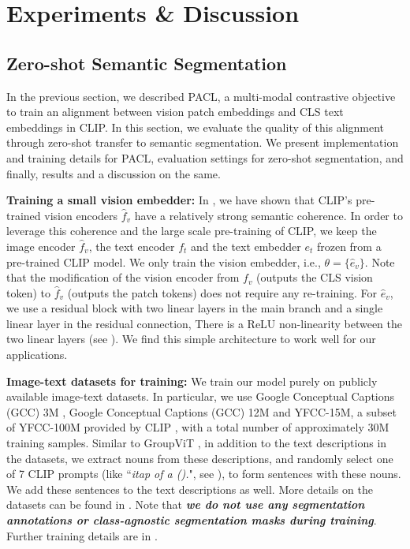 \documentclass[10pt,twocolumn,letterpaper]{article}
\begin{document}
\section{Experiments \& Discussion}

\subsection{Zero-shot Semantic Segmentation}
\label{sec:zeroshot_semantic_segmentation}

In the previous section, we described PACL, a multi-modal contrastive objective to train an alignment between vision patch embeddings and CLS text embeddings in CLIP. In this section, we evaluate the quality of this alignment through zero-shot transfer to semantic segmentation. We present implementation and training details for PACL, evaluation settings for zero-shot segmentation, and finally, results and a discussion on the same.

\textbf{Training a small vision embedder:} 
In , we have shown that CLIP's pre-trained vision encoders $\hat{f}_v$ have a relatively strong semantic coherence. In order to leverage this coherence and the large scale pre-training of CLIP, we keep the image encoder $\hat{f}_v$, the text encoder $f_t$ and the text embedder $e_t$ frozen from a pre-trained CLIP model. We only train the vision embedder, i.e., $\theta = \{\hat{e}_v\}$. Note that the modification of the vision encoder from $f_v$ (outputs the CLS vision token) to $\hat{f}_v$ (outputs the patch tokens) does not require any re-training. For $\hat{e}_v$, we use a residual block with two linear layers in the main branch and a single linear layer in the residual connection, There is a ReLU non-linearity between the two linear layers (see ). We find this simple architecture to work well for our applications.

\textbf{Image-text datasets for training:} We train our model purely on publicly available image-text datasets. In particular, we use Google Conceptual Captions (GCC) 3M \cite{sharma2018conceptual}, Google Conceptual Captions (GCC) 12M \cite{changpinyo2021cc12m} and YFCC-15M, a subset of YFCC-100M \cite{thomee2016yfcc100m} provided by CLIP \cite{radford2021learning}, with a total number of approximately 30M training samples. Similar to GroupViT \cite{xu2022groupvit}, in addition to the text descriptions in the datasets, we extract nouns from these descriptions, and randomly select one of 7 CLIP prompts (like ``\emph{itap of a ().}", see ), to form sentences with these nouns. We add these sentences to the text descriptions as well. More details on the datasets can be found in . Note that \textbf{\emph{we do not use any segmentation annotations or class-agnostic segmentation masks during training}}. Further training details are in .
\end{document}
